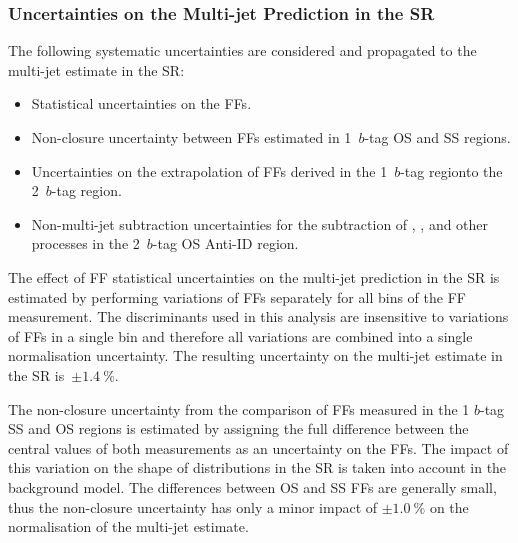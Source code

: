 \subsubsection{Uncertainties on the Multi-jet Prediction in the \hadhad SR}

%

The following systematic uncertainties are considered and propagated to the
multi-jet estimate in the \hadhad SR:
\begin{itemize}

\item Statistical uncertainties on the FFs.

\item Non-closure uncertainty between FFs estimated in 1~$b$-tag OS and SS
  regions.

\item Uncertainties on the extrapolation of FFs derived in the 1~$b$-tag
  regionto the 2~$b$-tag region.

\item Non-multi-jet subtraction uncertainties for the subtraction of \ttbar,
  \ttbarFakes, and other processes in the 2~$b$-tag OS Anti-ID region.

\end{itemize}

The effect of FF statistical uncertainties on the multi-jet prediction in the SR
is estimated by performing variations of FFs separately for all bins of the FF
measurement. The discriminants used in this analysis are insensitive to
variations of FFs in a single bin and therefore all variations are combined into
a single normalisation uncertainty. The resulting uncertainty on the multi-jet
estimate in the SR is~$\pm \SI{1.4}{\percent}$.

The non-closure uncertainty from the comparison of FFs measured in the 1 $b$-tag
SS and OS regions is estimated by assigning the full difference between the
central values of both measurements as an uncertainty on the FFs. The impact of
this variation on the shape of distributions in the SR is taken into account in
the background model. The differences between OS and SS FFs are generally small,
thus the non-closure uncertainty has only a minor impact of
$\pm \SI{1.0}{\percent}$ on the normalisation of the multi-jet estimate.

